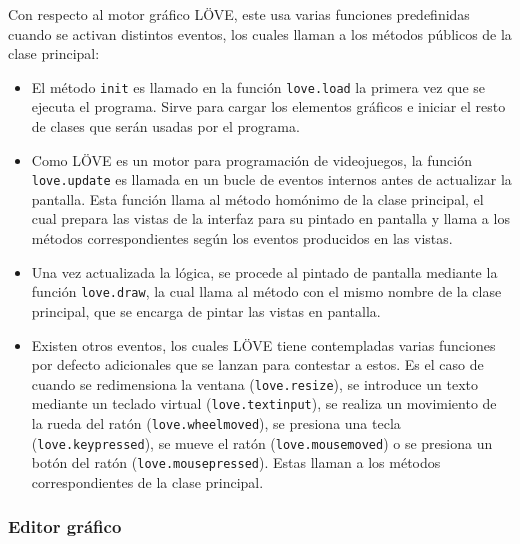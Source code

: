 Con respecto al motor gráfico LÖVE, este usa varias funciones predefinidas cuando se activan distintos eventos, los cuales llaman a los métodos públicos de la clase principal:

\begin{itemize}
	\item El método \texttt{init} es llamado en la función \texttt{love.load} la primera vez que se ejecuta el programa. Sirve para cargar los elementos gráficos e iniciar el resto de clases que serán usadas por el programa.
	\item Como LÖVE es un motor para programación de videojuegos, la función \texttt{love.update} es llamada en un bucle de eventos internos antes de actualizar la pantalla. Esta función llama al método homónimo de la clase principal, el cual prepara las vistas de la interfaz para su pintado en pantalla y llama a los métodos correspondientes según los eventos producidos en las vistas.
	\item Una vez actualizada la lógica, se procede al pintado de pantalla mediante la función \texttt{love.draw}, la cual llama al método con el mismo nombre de la clase principal, que se encarga de pintar las vistas en pantalla.
	\item Existen otros eventos, los cuales LÖVE tiene contempladas varias funciones por defecto adicionales que se lanzan para contestar a estos. Es el caso de cuando se redimensiona la ventana (\texttt{love.resize}), se introduce un texto mediante un teclado virtual (\texttt{love.textinput}), se realiza un movimiento de la rueda del ratón (\texttt{love.wheelmoved}), se presiona una tecla (\texttt{love.keypressed}), se mueve el ratón (\texttt{love.mousemoved}) o se presiona un botón del ratón (\texttt{love.mousepressed}). Estas llaman a los métodos correspondientes de la clase principal.
\end{itemize}

\subsubsection{Editor gráfico}
\label{subsubsec:client}

